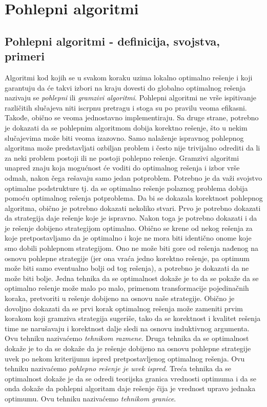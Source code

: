 \documentclass{article}
\begin{document}
\section{Pohlepni algoritmi}
\subsection{Pohlepni algoritmi - definicija, svojstva, primeri}
Algoritmi kod kojih se u svakom koraku uzima lokalno optimalno rešenje i koji
garantuju da će takvi izbori na kraju dovesti do globalno optimalnog rešenja
nazivaju se \textit{pohlepni} ili \textit{gramzivi algoritmi}. Pohlepni
algoritmi ne vrše ispitivanje različitih slučajeva niti iscrpnu pretragu i stoga
su po pravilu veoma efikasni. Takođe, obično se veoma jednostavno implementiraju. Sa druge
strane, potrebno je dokazati da se pohlepnim algoritmom dobija korektno rešenje, što u nekim slučajevima može biti veoma izazovno. Samo
nalaženje ispravnog pohlepnog algoritma može predstavljati ozbiljan problem i
često nije trivijalno odrediti da li za neki problem postoji ili ne postoji pohlepno
rešenje.
Gramzivi algoritmi unapred znaju
koja mogućnost će voditi do optimalnog rešenja i izbor vrše odmah, nakon
čega rešavaju samo jedan potproblem. Potrebno je da važi svojstvo optimalne podstrukture
tj. da se optimalno rešenje polaznog problema dobija pomoću optimalnog rešenja
potproblema.
Da bi se dokazala korektnost pohlepnog algoritma, obično je potrebno dokazati
nekoliko stvari.
Prvo je potrebno dokazati da strategija daje rešenje koje je ispravno.
Nakon toga je potrebno dokazati i da je rešenje dobijeno strategijom optimalno.
Obično
se krene od nekog rešenja za koje pretpostavljamo da je optimalno i koje ne
mora biti identično onome koje smo dobili pohlepnom strategijom. Ono ne može
biti gore od rešenja nađenog na osnovu pohlepne strategije (jer ona vraća jedno
korektno rešenje, pa optimum može biti samo eventualno bolji od tog rešenja), a
potrebno je dokazati da ne može biti bolje.
Jedna tehnika da se optimalnost dokaže je to da se pokaže da se optimalno
rešenje može malo po malo, primenom transformacije pojedinačnih koraka,
pretvoriti u rešenje dobijeno na osnovu naše strategije. Obično je dovoljno
dokazati da se prvi korak optimalnog rešenja može zameniti prvim korakom
koji gramziva strategija sugeriše, tako da se korektnost i kvalitet rešenja time ne narušavaju i korektnost dalje sledi na osnovu induktivnog argumenta. Ovu
tehniku nazivaćemo \textit{tehnikom razmene}.
Druga tehnika da se optimalnost dokaže je to da se dokaže da je rešenje dobijeno
na osnovu pohlepne strategije uvek po nekom kriterijumu ispred pretpostavljenog
optimalnog rešenja. Ovu tehniku nazivaćemo \textit{pohlepno rešenje je uvek ispred}.
Treća tehnika da se optimalnost dokaže je da se odredi teorijska granica vrednosti
optimuma i da se onda dokaže da pohlepni algoritam daje rešenje čija je vrednost
upravo jednaka optimumu. Ovu tehniku nazivaćemo \textit{tehnikom granice}.
\end{document}
